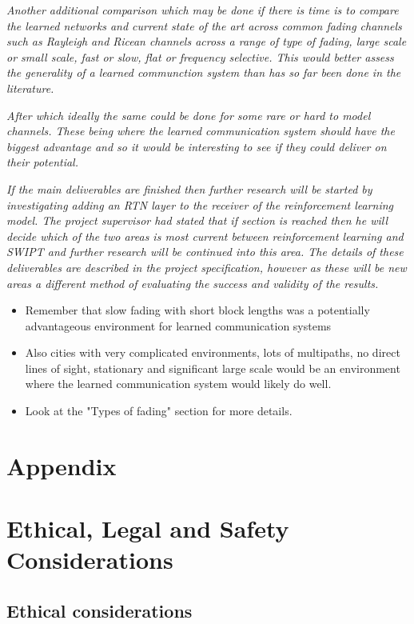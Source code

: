 \documentclass[12pt,onecolumn,letterpaper]{article}
\begin{document}
\textit{
Another additional comparison which may be done if there is time is to compare the learned networks and current state of the art across common fading channels such as Rayleigh and Ricean channels across a range of type of fading, large scale or small scale, fast or slow, flat or frequency selective. This would better assess the generality of a learned communction system than has so far been done in the literature.
}

\textit{
After which ideally the same could be done for some rare or hard to model channels. These being where the learned communication system should have the biggest advantage and so it would be interesting to see if they could deliver on their potential.
}

\textit{
If the main deliverables are finished then further research will be started by investigating adding an RTN layer to the receiver of the reinforcement learning model. The project supervisor had stated that
if section is reached then he will decide which of the two areas is most current between reinforcement learning and SWIPT and further research will be continued into this area. The details of these deliverables are described in the project specification, however as these will be new areas a different method of evaluating the success and validity of the results.
}

\begin{itemize}
   \item Remember that slow fading with short block lengths was a potentially advantageous environment for learned communication systems
   \item Also cities with very complicated environments, lots of multipaths, no direct lines of sight, stationary and significant large scale would be an environment where the learned communication system would likely do well.
   \item Look at the "Types of fading" section for more details.
\end{itemize}


\FloatBarrier
\appendix
\section{Appendix}

\section{Ethical, Legal and Safety Considerations}

\subsection{Ethical considerations}
\end{document}

